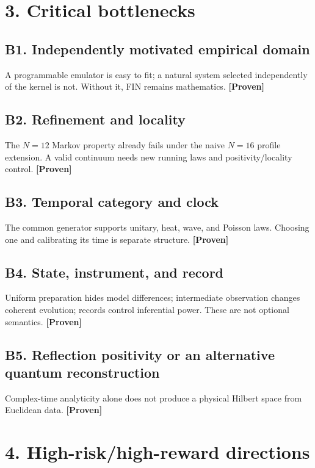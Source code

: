 \documentclass[11pt,a4paper,openany]{report}
\newcommand{\statusProven}{\textcolor{fingreen}{[Proven]}}
\begin{document}
\section{3. Critical bottlenecks}

\subsection{B1. Independently motivated empirical domain}

A programmable emulator is easy to fit; a natural system selected independently of the kernel is not. Without it, FIN remains mathematics. \textbf{\statusProven{}}

\subsection{B2. Refinement and locality}

The \(N=12\) Markov property already fails under the naive \(N=16\) profile extension. A valid continuum needs new running laws and positivity/\allowbreak{}locality control. \textbf{\statusProven{}}

\subsection{B3. Temporal category and clock}

The common generator supports unitary, heat, wave, and Poisson laws. Choosing one and calibrating its time is separate structure. \textbf{\statusProven{}}

\subsection{B4. State, instrument, and record}

Uniform preparation hides model differences; intermediate observation changes coherent evolution; records control inferential power. These are not optional semantics. \textbf{\statusProven{}}

\subsection{B5. Reflection positivity or an alternative quantum reconstruction}

Complex-time analyticity alone does not produce a physical Hilbert space from Euclidean data. \textbf{\statusProven{}}

\section{4. High-risk/\allowbreak{}high-reward directions}
\end{document}

